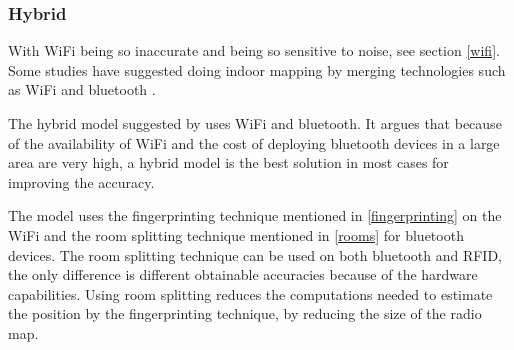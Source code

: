 \subsubsection{Hybrid}
With WiFi being so inaccurate and being so sensitive to noise, see section \ref{wifi}.
Some studies have suggested doing indoor mapping by merging technologies such as WiFi and bluetooth \cite{hybrid_wifi_bluetooth} \cite{fusion_wifi_bluetooth}.

The hybrid model suggested by \citet{hybrid_wifi_bluetooth} uses WiFi and bluetooth.
It argues that because of the availability of WiFi and the cost of deploying bluetooth devices in a large area are very high, a hybrid model is the best solution in most cases for improving the accuracy.

The model uses the fingerprinting technique mentioned in \cref{fingerprinting} on the WiFi and the room splitting technique mentioned in \cref{rooms} for bluetooth devices.
The room splitting technique can be used on both bluetooth and RFID, the only difference is different obtainable accuracies because of the hardware capabilities.
Using room splitting reduces the computations needed to estimate the position by the fingerprinting technique, by reducing the size of the radio map.